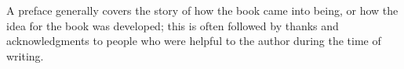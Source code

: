 A preface generally covers the story of how the book came into being, or how the idea for the book was developed; this is often followed by thanks and acknowledgments to people who were helpful to the author during the time of writing.

